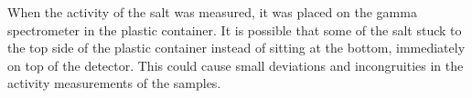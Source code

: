When the activity of the salt was measured, it was placed on the gamma spectrometer in the plastic container. It is possible that some of the salt stuck to the top side of the plastic container instead of sitting at the bottom, immediately on top of the detector. This could cause small deviations and incongruities in the activity measurements of the samples. 
